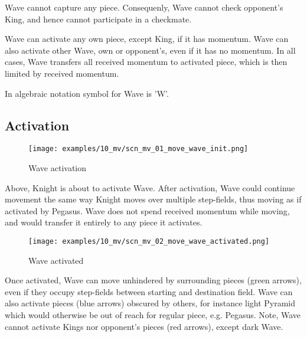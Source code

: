 Wave cannot capture any piece. Consequenly, Wave cannot check opponent's
King, and hence cannot participate in a checkmate.

Wave can activate any own piece, except King, if it has momentum. Wave can
also activate other Wave, own or opponent's, even if it has no momentum. In
all cases, Wave transfers all received momentum to activated piece, which is
then limited by received momentum.

In algebraic notation symbol for Wave is 'W'.

\clearpage %

\subsection*{Activation}

\noindent
\begin{figure}[h]
\texttt{[image: examples/10\_mv/scn\_mv\_01\_move\_wave\_init.png]}
\caption{Wave activation}
\label{fig:scn_mv_01_move_wave_init}
\end{figure}

Above, Knight is about to activate Wave. After activation, Wave could
continue movement the same way Knight moves over multiple step-fields,
thus moving as if activated by Pegasus. Wave does not spend received
momentum while moving, and would transfer it entirely to any piece it
activates.

\clearpage %

\noindent
\begin{figure}[h]
\texttt{[image: examples/10\_mv/scn\_mv\_02\_move\_wave\_activated.png]}
\caption{Wave activated}
\label{fig:scn_mv_02_move_wave_activated}
\end{figure}

Once activated, Wave can move unhindered by surrounding pieces (green arrows),
even if they occupy step-fields between starting and destination field. Wave
can also activate pieces (blue arrows) obscured by others, for instance light
Pyramid which would otherwise be out of reach for regular piece, e.g. Pegasus.
Note, Wave cannot activate Kings nor opponent's pieces (red arrows), except
dark Wave.

